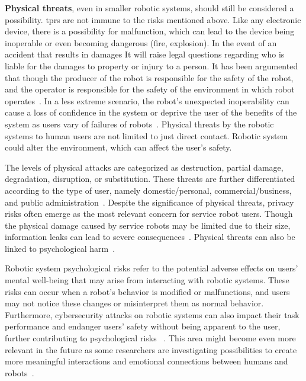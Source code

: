 \textbf{Physical threats}, even in smaller robotic systems, should still be considered a possibility. \ac{tprs} are not immune to the risks mentioned above. Like any electronic device, there is a possibility for malfunction, which can lead to the device being inoperable or even becoming dangerous (fire, explosion). In the event of an accident that results in damages
It will raise legal questions regarding who is liable for the damages to property or injury to a person. It has been argumented that though
the producer of the robot is responsible for the safety of the robot, and the operator is responsible for the safety of the environment in
which robot operates~\cite[]{if_robots_cause_harm_2016}.
In a less extreme scenario, the robot's
unexpected inoperability can cause a loss
of confidence in the system or deprive the user of the benefits of the system as users vary of failures of robots~\cite[9-10]{
  higher_edu_perception_on_tprs_2022}. Physical threats by the robotic systems to human users are not limited to just
direct contact. Robotic system could alter the environment, which can affect the user's safety.

The levels of physical attacks are categorized as destruction, partial damage, degradation, disruption, or substitution. These threats are
further
differentiated according to the type of user, namely domestic/personal, commercial/business, and public administration~\cite[80]{cyber_sec_robotics_privacy_safety_2017}.
Despite the significance of physical threats, privacy risks often emerge as the most relevant concern for service robot users. Though the
physical damage caused by service robots may be limited due to their size, information leaks can lead to severe consequences~\cite[83]{
  cyber_sec_robotics_privacy_safety_2017}. Physical threats can also be linked to psychological harm~\cite[5]{cyber_sec_safety_robots_legal_2021}.

Robotic system psychological risks refer to the potential adverse effects on users' mental well-being that may arise from interacting
with robotic systems. These risks can occur when a robot's behavior is modified or malfunctions, and users may not notice these
changes
or misinterpret them as normal behavior. Furthermore, cybersecurity attacks on robotic systems can also impact their task performance and
endanger users' safety without being apparent to the user, further contributing to psychological risks ~\cite[5]{
  cyber_sec_safety_robots_legal_2021}. This area might become even more relevant in the future as some researchers are investigating
possibilities to create more meaningful interactions and emotional connections between humans and robots~\cite[186]{smart_design_engineering_2020}.

